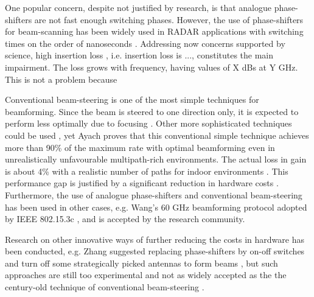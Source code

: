 One popular concern, despite not justified by research, is that analogue phase-shifters are not fast enough switching phases. However, the use of phase-shifters for beam-scanning has been widely used in \ac{RADAR} applications with switching times on the order of nanoseconds \cite{volakis}. Addressing now concerns supported by science, high insertion loss \cite{beam_steering_techniques}, i.e. insertion loss is ..., constitutes the main impairment. The loss grows with frequency, having values of X dBs at Y GHz. This is not a problem because %


Conventional beam-steering is one of the most simple techniques for beamforming. Since the beam is steered to one direction only, it is expected to perform less optimally due to focusing . Other more sophisticated techniques could be used \cite{beam_steering_techniques}, yet Ayach \cite{6292865} proves that this conventional simple technique achieves more than 90\% of the maximum rate with optimal beamforming even in unrealistically unfavourable multipath-rich environments. The actual loss in gain is about 4\% with a realistic number of paths for indoor environments \cite{8891356}. This performance gap is justified by a significant reduction in hardware costs \cite{7010533}. Furthermore, the use of analogue phase-shifters and conventional beam-steering has been used in other cases, e.g. Wang's 60 GHz beamforming protocol adopted by IEEE 802.15.3c \cite{5262295}, and is accepted by the research community.

Research on other innovative ways of further reducing the costs in hardware has been conducted, e.g. Zhang suggested replacing phase-shifters by on-off switches and turn off some strategically picked antennas to form beams \cite{8246591}, but such approaches are still too experimental and not as widely accepted as the the century-old technique of conventional beam-steering \cite{6591907}.







